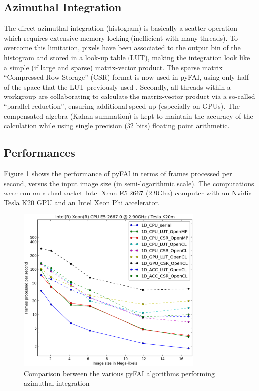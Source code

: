 \documentclass{iucr}
\begin{document}
\subsection{Azimuthal Integration}
The direct azimuthal integration (histogram) is basically a scatter operation
which requires extensive memory locking (inefficient with many threads).
To overcome this limitation, pixels have been
associated to the output bin of the histogram and stored in a look-up
table (LUT), making the integration look like a simple (if large and sparse)
matrix-vector product.
The sparse matrix ``Compressed Row Storage'' (CSR) format is now used in pyFAI,
using only half of the space that the LUT previously used \cite{PyFAI_PDJ}.
Secondly, all threads within a workgroup are collaborating to calculate the
matrix-vector product via a so-called ``parallel reduction'', ensuring
additional speed-up (especially on GPUs).
The compensated algebra (Kahan summation) is kept to maintain the accuracy
of the calculation while using single precision (32 bits) floating point
arithmetic.

\subsection{Performances}
Figure \ref{benchmark} shows the performance of pyFAI in terms of frames
processed per second, versus the input image size (in semi-logarithmic scale).
The computations were run on a dual-socket Intel Xeon
E5-2667 (2.9Ghz) computer with an Nvidia Tesla K20 GPU and an Intel Xeon Phi accelerator.

\begin{figure}
\label{benchmark}
\begin{center}
\includegraphics[width=9cm]{benchmark.eps}
\caption{Comparison between the various pyFAI algorithms performing
azimuthal integration}
\end{center}
\end{figure}
\end{document}
